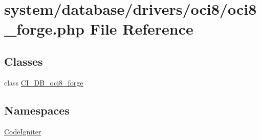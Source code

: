\hypertarget{oci8__forge_8php}{}\section{system/database/drivers/oci8/oci8\+\_\+forge.php File Reference}
\label{oci8__forge_8php}
\subsection*{Classes}
\begin{DoxyCompactItemize}
\item 
class \mbox{\hyperlink{class_c_i___d_b__oci8__forge}{C\+I\+\_\+\+D\+B\+\_\+oci8\+\_\+forge}}
\end{DoxyCompactItemize}
\subsection*{Namespaces}
\begin{DoxyCompactItemize}
\item 
 \mbox{\hyperlink{namespace_code_igniter}{Code\+Igniter}}
\end{DoxyCompactItemize}
